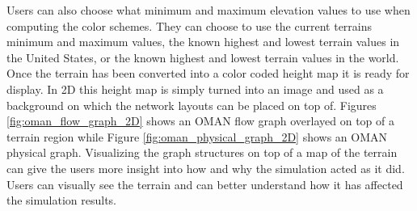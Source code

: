 Users can also choose what minimum and maximum elevation values to use when computing the color schemes.  They can choose to use the current terrains minimum and maximum values, the known highest and lowest terrain values in the United States, or the known highest and lowest terrain values in the world.  Once the terrain has been converted into a color coded height map it is ready for display.  In 2D this height map is simply turned into an image and used as a background on which the network layouts can be placed on top of.  Figures \ref{fig:oman_flow_graph_2D} shows an OMAN flow graph overlayed on top of a terrain region while Figure \ref{fig:oman_physical_graph_2D} shows an OMAN physical graph.  Visualizing the graph structures on top of a map of the terrain can give the users more insight into how and why the simulation acted as it did.  Users can visually see the terrain and can better understand how it has affected the simulation results.

